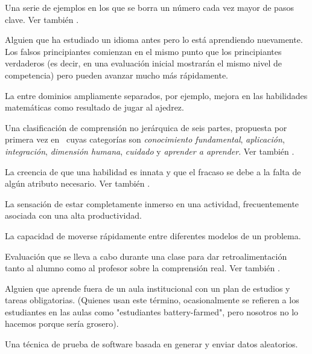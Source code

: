 \begin{description}
 Una serie de ejemplos en los que 
se borra un número cada vez mayor de pasos clave. Ver
también .

 Alguien que ha estudiado un idioma antes pero lo está aprendiendo nuevamente. Los falsos principiantes comienzan en el mismo punto que los principiantes verdaderos (es decir, en una evaluación inicial mostrarán el mismo nivel de competencia) pero pueden avanzar mucho más rápidamente.


 La  entre dominios ampliamente separados, por ejemplo, mejora en las habilidades matemáticas como resultado de jugar al ajedrez.

 Una clasificación de comprensión no jerárquica 
de seis partes, propuesta por primera vez en~\cite{Fink2013} cuyas categorías son \emph{conocimiento fundamental}, \emph{aplicación}, \emph{integración}, \emph{dimensión humana}, \emph{cuidado} y 
\emph{aprender a aprender}. Ver también .

 La creencia de que una habilidad es innata y que 
el fracaso se debe a la falta de algún atributo necesario. Ver también
.


 La sensación de estar completamente inmerso en una actividad, 
frecuentemente asociada con una alta productividad.

 La capacidad de moverse
rápidamente entre diferentes modelos de un problema.

 Evaluación que se lleva a cabo 
durante una clase para dar retroalimentación tanto al alumno como al profesor 
sobre la comprensión real. Ver
también .

 Alguien que aprende fuera de un aula institucional con un plan de estudios y tareas obligatorias. (Quienes usan este término, ocasionalmente se refieren a los estudiantes en las aulas como "estudiantes battery-farmed", pero nosotros no lo hacemos porque sería grosero).

 Una técnica de prueba de software 
basada en generar y enviar datos aleatorios.


\end{description}
